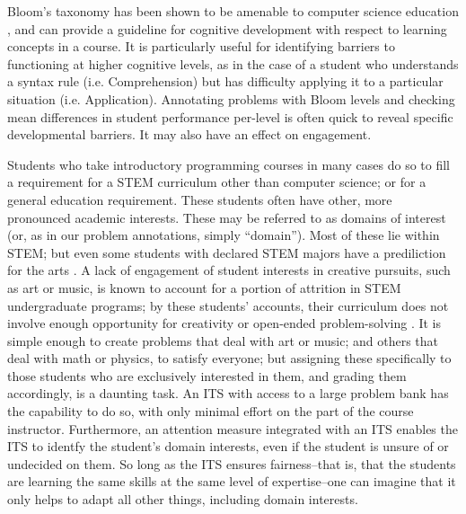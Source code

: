 \documentclass[hidelinks,11pt]{article}
\begin{document}
Bloom's taxonomy has been shown to be amenable to computer science education
{\citep{thompson2008}}, and can provide a guideline for cognitive development with
respect to learning concepts in a course.  It is particularly useful for
identifying barriers to functioning at higher cognitive levels, as in the case
of a student who understands a syntax rule (i.e. Comprehension) but has
difficulty applying it to a particular situation (i.e. Application). Annotating
problems with Bloom levels and checking mean differences in student performance
per-level is often quick to reveal specific developmental barriers.
It may also have an effect on engagement.

Students who take introductory programming courses in many cases
do so to fill a requirement for a STEM curriculum other than computer science;
or for a general education requirement. These students often have other, more
pronounced academic interests. These may be referred to as domains of interest
(or, as in our problem annotations, simply ``domain''). Most of these lie
within STEM; but even some students with declared STEM majors have a
prediliction for the arts {\citep{penn2004}}.  A lack of engagement of student
interests in creative pursuits, such as art or music, is known to account for a
portion of attrition in STEM undergraduate programs; by these students'
accounts, their curriculum does not involve enough opportunity for creativity
or open-ended problem-solving {\citep{penn2004}}.  It is simple enough to create
problems that deal with art or music; and others that deal with math or
physics, to satisfy everyone; but assigning these specifically to those
students who are exclusively interested in them, and grading them accordingly,
is a daunting task. An ITS with access to a large problem bank has the
capability to do so, with only minimal effort on the part of the course
instructor.  Furthermore, an attention measure integrated with an ITS enables
the ITS to identfy the student's domain interests, even if the student is
unsure of or undecided on them.  So long as the ITS ensures fairness--that is,
that the students are learning the same skills at the same level of
expertise--one can imagine that it only helps to adapt all other things,
including domain interests.
\end{document}
